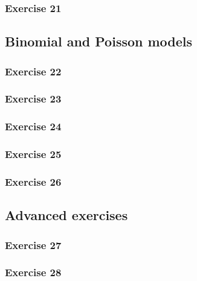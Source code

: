 \documentclass[english,]{article}
\begin{document}
\subsubsection{Exercise 21}\label{exercise-21}

\subsection{Binomial and Poisson
models}\label{binomial-and-poisson-models}

\subsubsection{Exercise 22}\label{exercise-22}

\subsubsection{Exercise 23}\label{exercise-23}

\subsubsection{Exercise 24}\label{exercise-24}

\subsubsection{Exercise 25}\label{exercise-25}

\subsubsection{Exercise 26}\label{exercise-26}

\subsection{Advanced exercises}\label{advanced-exercises}

\subsubsection{Exercise 27}\label{exercise-27}

\subsubsection{Exercise 28}\label{exercise-28}
\end{document}
